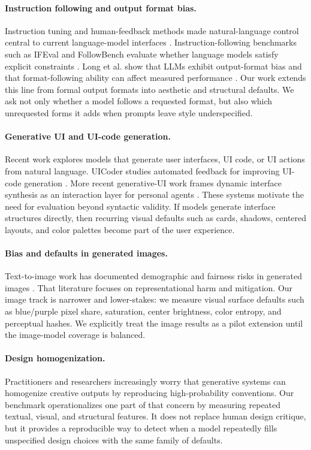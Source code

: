 \documentclass[10pt]{article}
\begin{document}
\paragraph{Instruction following and output format bias.}
Instruction tuning and human-feedback methods made natural-language control central to current language-model interfaces \cite{ouyang2022instructgpt}. Instruction-following benchmarks such as IFEval and FollowBench evaluate whether language models satisfy explicit constraints \cite{zhou2023ifeval,jiang2024followbench}. Long et al. show that LLMs exhibit output-format bias and that format-following ability can affect measured performance \cite{long2025format}. Our work extends this line from formal output formats into aesthetic and structural defaults. We ask not only whether a model follows a requested format, but also which unrequested forms it adds when prompts leave style underspecified.

\paragraph{Generative UI and UI-code generation.}
Recent work explores models that generate user interfaces, UI code, or UI actions from natural language. UICoder studies automated feedback for improving UI-code generation \cite{wu2024uicoder}. More recent generative-UI work frames dynamic interface synthesis as an interaction layer for personal agents \cite{kong2026macaron}. These systems motivate the need for evaluation beyond syntactic validity. If models generate interface structures directly, then recurring visual defaults such as cards, shadows, centered layouts, and color palettes become part of the user experience.

\paragraph{Bias and defaults in generated images.}
Text-to-image work has documented demographic and fairness risks in generated images \cite{bianchi2022t2i,friedrich2024fairness}. That literature focuses on representational harm and mitigation. Our image track is narrower and lower-stakes: we measure visual surface defaults such as blue/purple pixel share, saturation, center brightness, color entropy, and perceptual hashes. We explicitly treat the image results as a pilot extension until the image-model coverage is balanced.

\paragraph{Design homogenization.}
Practitioners and researchers increasingly worry that generative systems can homogenize creative outputs by reproducing high-probability conventions. Our benchmark operationalizes one part of that concern by measuring repeated textual, visual, and structural features. It does not replace human design critique, but it provides a reproducible way to detect when a model repeatedly fills unspecified design choices with the same family of defaults.
\end{document}
